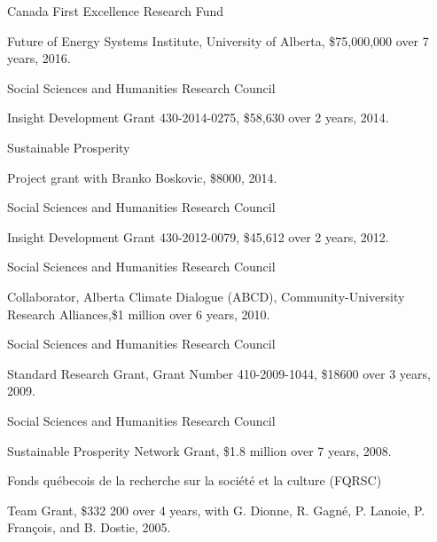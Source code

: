 \documentclass{article}[12pt]
\newcommand{\negind}{\hspace*{-15pt}}
\newcommand{\justlist}[1]{\negind #1 \smallskip}
\begin{document}

\justlist{\begin{bf}Canada First Excellence Research Fund\end{bf}
	Future of Energy Systems Institute, University of Alberta, \$75,000,000 over 7 years, 2016.}


\justlist{\begin{bf}Social Sciences and Humanities Research Council\end{bf}
Insight Development Grant 430-2014-0275, \$58,630 over 2 years, 2014.}

\justlist{\begin{bf}Sustainable Prosperity\end{bf} Project grant with Branko
Boskovic, \$8000, 2014.}

\justlist{\begin{bf}Social Sciences and Humanities Research Council\end{bf}
Insight Development Grant 430-2012-0079, \$45,612 over 2 years, 2012.}

\justlist{\begin{bf}Social Sciences and Humanities Research Council\end{bf}
Collaborator, Alberta Climate Dialogue (ABCD), Community-University Research
Alliances,\$1 million over 6 years, 2010.}

\justlist{\begin{bf}Social Sciences and Humanities Research Council\end{bf}
Standard Research Grant, Grant Number 410-2009-1044, \$18600 over 3 years,
2009.}

\justlist{\begin{bf}Social Sciences and Humanities Research Council\end{bf}
Sustainable Prosperity Network Grant, \$1.8 million over 7 years, 2008.}

\justlist{\begin{bf}Fonds qu\'{e}becois de la recherche sur la soci\'{e}t\'{e}
et la culture (FQRSC)\end{bf} Team Grant, \$332 200 over 4 years, with G.
Dionne, R. Gagn\'{e}, P. Lanoie, P. Fran\c{c}ois, and B. Dostie, 2005.}
\end{document}

